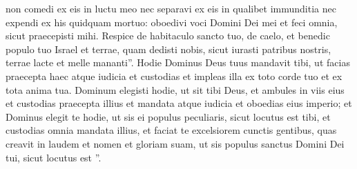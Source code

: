 \begin{biblechapter}
\begin{biblechapter}
\begin{biblechapter}
\begin{biblechapter}
\begin{biblechapter}
\begin{biblechapter}
\begin{biblechapter}
\begin{biblechapter}
\begin{biblechapter}
\begin{biblechapter}
\begin{biblechapter}
\begin{biblechapter}
\begin{biblechapter}
\begin{biblechapter}
\begin{biblechapter}
\begin{biblechapter}
\begin{biblechapter}
\begin{biblechapter}
\begin{biblechapter}
\begin{biblechapter}
\begin{biblechapter}
\begin{biblechapter}
\begin{biblechapter}
\begin{biblechapter}
\begin{biblechapter}
\begin{biblechapter}
\verse non comedi ex eis in luctu meo nec separavi ex eis in qualibet immunditia nec expendi ex his quidquam mortuo: oboedivi voci Domini Dei mei et feci omnia, sicut praecepisti mihi. 
\verse Respice de habitaculo sancto tuo, de caelo, et benedic populo tuo Israel et terrae, quam dedisti nobis, sicut iurasti patribus nostris, terrae lacte et melle mananti”.
 \verse Hodie Dominus Deus tuus mandavit tibi, ut facias praecepta haec atque iudicia et custodias et impleas illa ex toto corde tuo et ex tota anima tua. 
\verse Dominum elegisti hodie, ut sit tibi Deus, et ambules in viis eius et custodias praecepta illius et mandata atque iudicia et oboedias eius imperio; 
\verse et Dominus elegit te hodie, ut sis ei populus peculiaris, sicut locutus est tibi, et custodias omnia mandata illius, 
\verse et faciat te excelsiorem cunctis gentibus, quas creavit in laudem et nomen et gloriam suam, ut sis populus sanctus Domini Dei tui, sicut locutus est ”.
 

\end{biblechapter}
\end{biblechapter}
\end{biblechapter}
\end{biblechapter}
\end{biblechapter}
\end{biblechapter}
\end{biblechapter}
\end{biblechapter}
\end{biblechapter}
\end{biblechapter}
\end{biblechapter}
\end{biblechapter}
\end{biblechapter}
\end{biblechapter}
\end{biblechapter}
\end{biblechapter}
\end{biblechapter}
\end{biblechapter}
\end{biblechapter}
\end{biblechapter}
\end{biblechapter}
\end{biblechapter}
\end{biblechapter}
\end{biblechapter}
\end{biblechapter}
\end{biblechapter}
